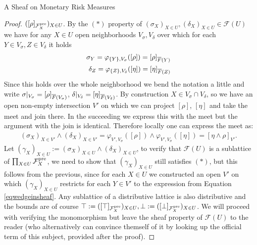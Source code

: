 \begin{subsection}{A Sheaf on Monetary Risk Measures}
\begin{proof}
        \( ([\rho]_{\mathcal{F}^{\text{pre}}_X})_{X \in U} \). By the \( (\ast) \) property of \( (\sigma_X)_{X \in U}, (\delta_X)_{X \in U} \in \mathcal{F}(U) \) 
        we have for any \( X \in U \) open neighborhoods \( V_{\sigma}, V_{\delta} \) over which for each \( Y \in V_{\sigma}, Z \in V_{\delta} \) it holds 
        \begin{align*}
            \sigma_Y = \varphi_{\{Y\},V_{\sigma}}([\rho]) = [\rho]_{\overline{F}\left (Y \right)} \\
            \delta_Z = \varphi_{\{Z\},V_{\delta}}([\eta]) = [\eta]_{\overline{F}\left (Z \right)}
        \end{align*}
        Since this holds over the whole neighborhood we bend the notation a little and write \( \sigma|_{V_{\sigma}} = [\rho]_{\overline{F}\left (V_{\sigma} \right)} \),
        \( \delta|_{V_{\delta}} = [\eta]_{\overline{F}\left (V_{\delta} \right)} \).
        By construction \( X \in V_{\sigma} \cap V_{\delta} \), so we have an open non-empty intersection \( V' \) on which we can project 
        \( [\rho] \), \( [\eta]_{} \) and take the meet and join there. In the succeeding we express this with the meet but the argument with the join is identical.
        Therefore locally one can express the meet as:
        \begin{align} \label{eqwedgeinsheaf}
            (\sigma_X)_{X \in V'} \wedge (\delta_X)_{X \in V'} = 
            \varphi_{V', V_{\sigma}}([\rho]) \wedge \varphi_{V', V_{\sigma}}([\eta]) = [\eta \wedge \rho]_{V'}.
        \end{align}
        Let \( (\gamma_{X})_{X \in U} := (\sigma_X)_{X \in U} \wedge (\delta_X)_{X \in U}\), to verify that \( \mathcal{F}(U) \)
        is a sublattice of \( \prod_{X \in U} \mathcal{F}^{\text{pre}}_X \), 
        we need to show that \( (\gamma_{X})_{X \in U} \) still satisfies \( (\ast) \), but this follows from the previous, since for each \( X \in U \) 
        we constructed an open \( V' \) on which \( (\gamma_{X})_{X \in U} \) restricts for each \( Y \in V' \) to the expression from Equation \ref{eqwedgeinsheaf}.
        Any sublattice of a distributive lattice is also distributive and the bounds are of course
        \(\top := ([\top]_{\mathcal{F}^{\text{pre}}_X})_{X \in U}, \bot := ([\bot]_{\mathcal{F}^{\text{pre}}_X})_{X \in U} \).
        \newline
        \newline
        We will proceed with verifying the monomorphism but leave the sheaf property of \( \mathcal{F}(U) \) to the reader (who alternatively can convince
        themself of it by looking up the official term of this subject, provided after the proof).

\end{proof}
\end{subsection}
